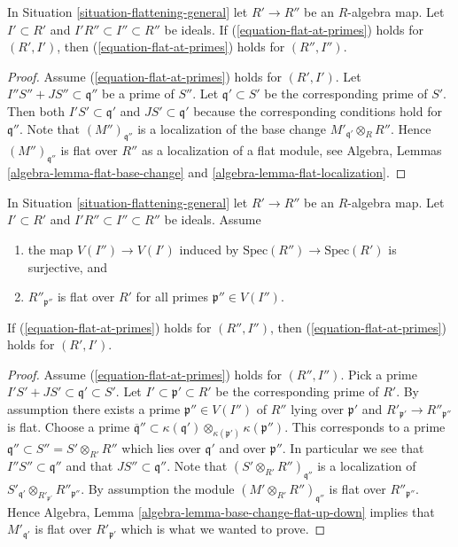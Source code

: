 \begin{lemma}
\label{lemma-base-change-flat-at-primes}
In Situation \ref{situation-flattening-general}
let $R' \to R''$ be an $R$-algebra map.
Let $I' \subset R'$ and $I'R'' \subset I'' \subset R''$ be ideals.
If (\ref{equation-flat-at-primes}) holds for
$(R', I')$, then (\ref{equation-flat-at-primes})
holds for $(R'', I'')$.
\end{lemma}

\begin{proof}
Assume (\ref{equation-flat-at-primes}) holds for $(R', I')$.
Let $I''S'' + JS'' \subset \mathfrak q''$ be a prime of $S''$.
Let $\mathfrak q' \subset S'$ be the corresponding prime of $S'$.
Then both $I'S' \subset \mathfrak q'$ and $JS' \subset \mathfrak q'$
because the corresponding conditions hold for $\mathfrak q''$.
Note that $(M'')_{\mathfrak q''}$
is a localization of the base change $M'_{\mathfrak q'} \otimes_R R''$.
Hence $(M'')_{\mathfrak q''}$ is flat over $R''$ as a localization
of a flat module, see
Algebra, Lemmas \ref{algebra-lemma-flat-base-change} and
\ref{algebra-lemma-flat-localization}.
\end{proof}

\begin{lemma}
\label{lemma-flat-descent-flat-at-primes}
In Situation \ref{situation-flattening-general}
let $R' \to R''$ be an $R$-algebra map.
Let $I' \subset R'$ and $I'R'' \subset I'' \subset R''$ be ideals.
Assume
\begin{enumerate}
\item the map $V(I'') \to V(I')$ induced by
$\text{Spec}(R'') \to \text{Spec}(R')$ is surjective, and
\item $R''_{\mathfrak p''}$ is flat over $R'$ for all primes
$\mathfrak p'' \in V(I'')$.
\end{enumerate}
If (\ref{equation-flat-at-primes}) holds for
$(R'', I'')$, then (\ref{equation-flat-at-primes}) holds for $(R', I')$.
\end{lemma}

\begin{proof}
Assume (\ref{equation-flat-at-primes}) holds for $(R'', I'')$. Pick a prime
$I'S' + JS' \subset \mathfrak q' \subset S'$. Let
$I' \subset \mathfrak p' \subset R'$ be the corresponding prime of $R'$.
By assumption there exists a prime $\mathfrak p'' \in V(I'')$ of $R''$
lying over $\mathfrak p'$ and $R'_{\mathfrak p'} \to R''_{\mathfrak p''}$
is flat. Choose a prime
$\overline{\mathfrak q}'' \subset
\kappa(\mathfrak q') \otimes_{\kappa(\mathfrak p')} \kappa(\mathfrak p'')$.
This corresponds to a prime $\mathfrak q'' \subset S'' = S' \otimes_{R'} R''$
which lies over $\mathfrak q'$ and over $\mathfrak p''$. In particular
we see that $I''S'' \subset \mathfrak q''$ and that
$JS'' \subset \mathfrak q''$. Note that
$(S' \otimes_{R'} R'')_{\mathfrak q''}$ is a localization of
$S'_{\mathfrak q'} \otimes_{R'_{\mathfrak p'}} R''_{\mathfrak p''}$.
By assumption the module $(M' \otimes_{R'} R'')_{\mathfrak q''}$ is
flat over $R''_{\mathfrak p''}$. Hence
Algebra, Lemma \ref{algebra-lemma-base-change-flat-up-down}
implies that $M'_{\mathfrak q'}$ is flat over $R'_{\mathfrak p'}$
which is what we wanted to prove.
\end{proof}

